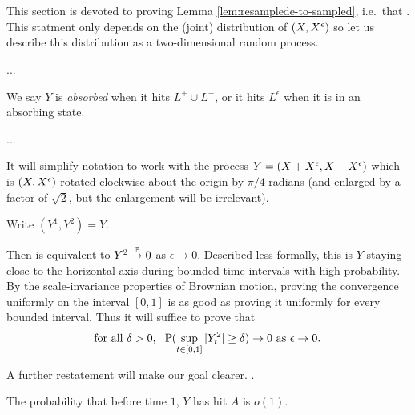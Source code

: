 {
\section{}
\label{sec:proof-of-lem:resamplede-to-sampled}

\newcommand{\bandwidth}{\delta}
\newcommand{\rotproc}{Y}

\newcommand{\union}{\cup}
\renewcommand{\L}{L^+ \union L^-}
\newcommand{\Le}{L^\epsilon}

This section is devoted to proving Lemma
\ref{lem:resamplede-to-sampled}, i.e.\ that
\statementoflemresampledetosampled.  This statment only depends on the
(joint) distribution of $(\sampled, \resamplede)$ so let us describe this
distribution as a two-dimensional random process.

...

\begin{definition}
  We say $Y$ is \emph{absorbed} when it hits $\L$, or it hits $\Le$
  when it is in an absorbing state.
\end{definition}

...

It will simplify notation to work with the process $\rotproc =
(\sampled + \resamplede, \sampled - \resamplede)$ which is $(\sampled,
\resamplede)$ rotated clockwise about the origin by $\pi / 4$ radians (and enlarged by a factor of
$\sqrt{2}$, but the enlargement will be irrelevant).

Write $(\rotproc^1, \rotproc^2) = Y$.

Then \statementoflemresampledetosampled{} is equivalent to $\rotproc^2
\toinP 0$ as $\epsilon \to 0$.
Described less formally, this is $\rotproc$ staying close to the
horizontal axis during bounded time intervals with high probability.
By the scale-invariance properties of Brownian motion, proving the
convergence uniformly on the interval $[0,1]$ is as good as proving it
uniformly for every bounded interval.  Thus it will suffice to prove that
\[\text{
  for all $\delta > 0$, \, $\P(\sup_{t \in [0,1]} |Y^2_t| \ge \delta) \to 0$ as $\epsilon
  \to 0$.
}\]

\newcommand{\boundarylines}{A}

A further restatement will make our goal clearer.  \FIXME{}{Introduce
  $\boundarylines$}.

\begin{lemma}
  \label{lem:hit-boundary-lines-o1}
  The probability that before time $1$, $Y$ has hit $\boundarylines$
  is $o(1)$.
\end{lemma}

}
